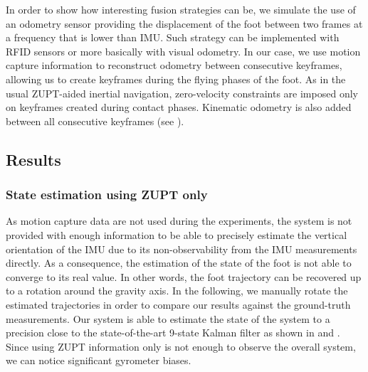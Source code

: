 In order to show how interesting fusion strategies can be, we simulate the use of an odometry sensor providing the displacement of the foot between two frames at a frequency that is lower than IMU. Such strategy can be implemented with
RFID sensors or more basically with visual odometry. In our case, we use motion capture information to reconstruct odometry between consecutive keyframes, allowing us to create keyframes during the flying phases of the foot. As in the usual ZUPT-aided inertial
navigation, zero-velocity constraints are imposed only on keyframes created during contact phases. Kinematic odometry is also added between all consecutive keyframes (see ).

%

\subsection{Results}
\subsubsection{State estimation using ZUPT only}

As motion capture data are not used during the experiments, the system is not provided with enough information to be able to precisely estimate the vertical orientation of the IMU due to its non-observability from the IMU measurements directly. 
As a consequence, the estimation of the state of the foot is not able to converge to its real value. In other words, the foot trajectory can be recovered up to a rotation around the gravity axis. 
In the following, we manually rotate the estimated trajectories in order to compare our results against the ground-truth measurements.
Our system is able to estimate the state of the system to a precision close to the state-of-the-art 9-state Kalman filter as shown in  and .
Since using ZUPT information only is not enough to observe the overall system, we can notice significant gyrometer biases.

